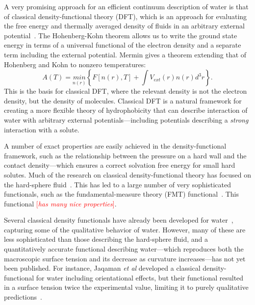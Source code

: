 \documentclass[letterpaper,twocolumn,amsmath,amssymb,prb]{revtex4-1}
\newcommand{\needsworknow}[1]{\textcolor{red}{[\emph{#1}]}}
\begin{document}
A very promising approach for an efficient continuum description of water
is that of classical density-functional theory (DFT), which is an approach
for evaluating the free energy and thermally averaged density of fluids in
an arbitrary external potential~\cite{ebner1976density}. The Hohenberg-Kohn
theorem\cite{hohenberg1964inhomogeneous} allows us to write the ground state
energy in terms of a universal functional of the electron density and a separate
term including the external potential. Mermin\cite{mermin1965thermal} gives a
theorem extending that of Hohenberg and Kohn to nonzero temperatures:
\begin{equation}
  A(T) = \underset{n(r)}{min}\left\{ F[n(r),T] + \int V_{ext}(r) n(r)
d^3r\right\}.
\end{equation}
This is the basis for classical DFT, where the relevant density is not the
electron density, but the density of molecules. Classical DFT is a
natural framework for creating a more flexible theory of hydrophobicity
that can describe interaction of water with arbitrary external
potentials---including potentials describing a \emph{strong} interaction
with a solute.
 
A number of exact properties are easily achieved in the density-functional
framework, such as the relationship between the pressure on a hard wall and
the contact density---which ensures a correct solvation free energy for
small hard solutes.  Much of the research on classical density-functional
theory has focused on the hard-sphere fluid~\cite{curtin1985,
rosenfeld1989, rosenfeld1993, rosenfeld1997, tarazona1997, tarazona2000}.
This has led to a large number of very sophisticated functionals, such as
the fundamental-measure theory (FMT) functional~\cite{rosenfeld1989,
rosenfeld1993, rosenfeld1997, tarazona1997, tarazona2000}.  This functional
\needsworknow{has many nice properties}.

Several classical density functionals have already been developed for
water~\cite{ding1987, Yang1992, Jaqaman2004}, capturing some of the
qualitative behavior of water.  However, many of these are less
sophisticated than those describing the hard-sphere fluid, and a
quantitatively accurate functional describing water---which reproduces
both the macroscopic surface tension and its decrease as curvature
increases---has not yet been published.  For instance, Jaqaman
\emph{et al} developed a classical density-functional for water
including orientational effects, but their functional resulted in a
surface tension twice the experimental value, limiting it to purely
qualitative predictions~\cite{Jaqaman2004}.
\end{document}
